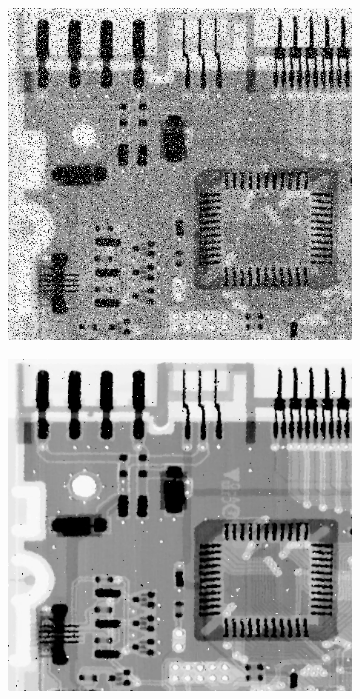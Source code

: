 \begin{figure}[h]
	\centering
	\begin{subfigure}[b]{0.4\linewidth}
		\includegraphics[width=\linewidth]{myfigure/p4/42-peppersalt.png}
		\caption{}
		\label{fig:5-10a}
	\end{subfigure}
	\begin{subfigure}[b]{0.4\linewidth}
		\includegraphics[width=\linewidth]{myfigure/p4/42-pepsalt-median-1.png}

\end{subfigure}
\end{figure}

